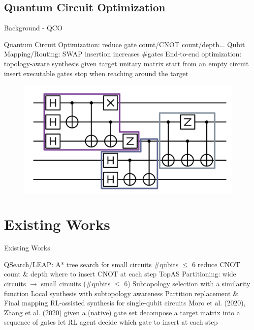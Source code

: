 \documentclass{beamer}
\begin{document}
\subsection{Quantum Circuit Optimization}
\begin{frame}{Background - QCO}
    \begin{outline}
        \1 Quantum Circuit Optimization: reduce gate count/CNOT count/depth...
        \1 Qubit Mapping/Routing: SWAP insertion increases \#gates
        \1 End-to-end optimization: topology-aware synthesis
            \2 given target unitary matrix
            \2 start from an empty circuit
            \2 insert executable gates
            \2 stop when reaching around the target
    \end{outline}
    \begin{figure}
        \centering
        \includegraphics[scale=0.08]{qc.png}
    \end{figure}
\end{frame}

\section{Existing Works}

\begin{frame}{Existing Works}
    \begin{outline}
        \1 QSearch/LEAP: A* tree search for small circuits
            \2 \#qubits $\leq$ 6
            \2 reduce CNOT count \& depth
            \2 where to insert CNOT at each step
        \1 TopAS
            \2 Partitioning: wide circuits $\rightarrow$ small circuits (\#qubits $\leq$ 6)
            \2 Subtopology selection with a similarity function
            \2 Local synthesis with subtopology awareness
            \2 Partition replacement \& Final mapping
        \1 RL-assisted synthesis for single-qubit circuits
            \2 Moro et al. (2020), Zhang et al. (2020)
            \2 given a (native) gate set
            \2 decompose a target matrix into a sequence of gates
            \2 let RL agent decide which gate to insert at each step
    \end{outline}
\end{frame}
\end{document}
